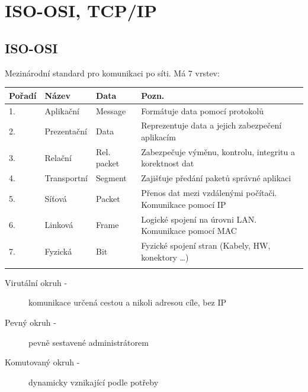 \section{ISO-OSI, TCP/IP}
\subsection{ISO-OSI}
Mezinárodní standard pro komunikaci po síti. Má 7 vrstev: \\
\begin{tabularx}{\linewidth}{l|l|l|l}
  \textbf{Pořadí} & \textbf{Název} & \textbf{Data} & \textbf{Pozn.}                                            \\
  \hline
  1.              & Aplikační      & Message       & Formátuje data pomocí protokolů                           \\
  \hline
  2.              & Prezentační    & Data          & Reprezentuje data a jejich zabezpečení aplikacím          \\
  \hline
  3.              & Relační        & Rel. packet   & Zabezpečuje výměnu, kontrolu, integritu a korektnost dat  \\
  \hline
  4.              & Transportní    & Segment       & Zajišťuje předání paketů správné aplikaci                 \\
  \hline
  5.              & Síťová         & Packet        & Přenos dat mezi vzdálenými počítači. Komunikace pomocí IP \\
  \hline
  6.              & Linková        & Frame         & Logické spojení na úrovni LAN. Komunikace pomocí MAC      \\
  \hline
  7.              & Fyzická        & Bit           & Fyzické spojení stran (Kabely, HW, konektory \dots)       \\
  \multicolumn{2}{l}{}                                                                                         \\
\end{tabularx}
\begin{description}
  \item[Virutální okruh -] komunikace určená cestou a nikoli adresou cíle, bez IP
  \item[Pevný okruh -] pevně sestavené administrátorem
  \item[Komutovaný okruh -] dynamicky vznikající podle potřeby
\end{description}
